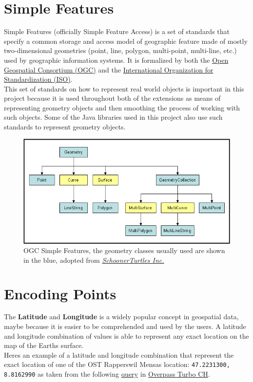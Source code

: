 \section{Simple Features}
Simple Features (officially Simple Feature Access) is a set of standards that specify
a common storage and access model of geographic feature made of mostly
two-dimensional geometries (point, line, polygon, multi-point, multi-line, etc.)
used by geographic information systems.
It is formalized by both the \href{https://www.ogc.org/}{Open Geospatial Consortium (OGC)} and the
\href{https://www.iso.org/home.html}{International Organization for Standardization (ISO)}.~\cite{SimpleFeaturesWiki}\\
\newline
This set of standards on how to represent real world objects is important in this project because it is used throughout
both of the extensions as means of representing geometry objects and then smoothing the process of working with such objects.
Some of the Java libraries used in this project also use such standards to represent geometry objects.
\begin{figure}[H]
    \centering
    \includegraphics[width=\linewidth]{./Figures/Spatial_Data/simple_features}
    \caption{OGC Simple Features, the geometry classes usually used are shown in the blue, adopted from \href{http://gsp.humboldt.edu/Websites/BlueSpray/STUsersGuide/Scripting/Script_SimpleFeatures.html}{\textit{SchoonerTurtles Inc.}}~\cite{SchoonerTurtles}}
\end{figure}
\section{Encoding Points}
The \textbf{Latitude} and \textbf{Longitude} is a widely popular concept in geospatial data, maybe because it is easier
to be comprehended and used by the users. A latitude and longitude combination of values is able to represent any exact location on the map
of the Earth\textquotesingle s surface.\\
\newline
Here\textquotesingle s an example of a latitude and longitude combination that represent the exact location of one of the OST Rapperswil
Mensas location: \texttt{47.2231300, 8.8162990} as taken from the following
\href{http://overpass-turbo.osm.ch/?Q=area%0A%20%20%5B%22name%22%3D%22Rapperswil-Jona%22%5D-%3E.a%3B%0A(%0A%09nwr%0A%20%20%20%20(area.a)%0A%20%20%20%20%5B%22name%22%3D%22Mensa%20OST%20Campus%20Rapperswil%20Jona%22%5D%3B%0A)%3B%0Aout%20center%3B&C=47.22281;8.81693;19}{query} in
\href{http://overpass-turbo.osm.ch/}{Overpass Turbo CH}.
